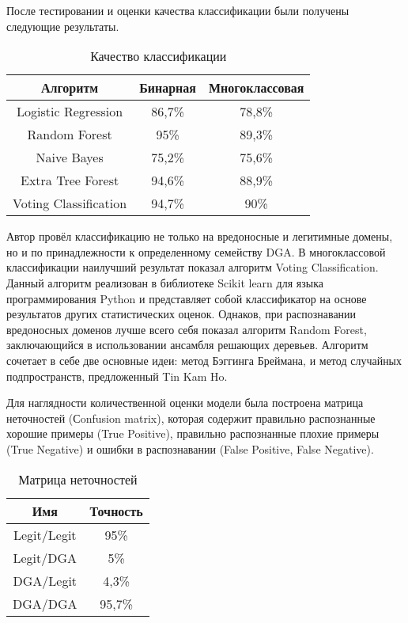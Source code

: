    После тестировании и оценки качества классификации были получены следующие результаты.
    \begin{table}[ht]
    \centering
    \caption{Качество классификации}\label{}
    \begin{tabular}{@{}ccc@{}}
    \toprule
    Алгоритм              & Бинарная & Многоклассовая \\ \midrule
    Logistic Regression   & 86,7\%   & 78,8\%         \\
    Random Forest         & 95\%     & 89,3\%         \\
    Naive Bayes           & 75,2\%   & 75,6\%         \\
    Extra Tree Forest     & 94,6\%   & 88,9\%         \\
    Voting Classification & 94,7\%   & 90\%           \\ \bottomrule
    \end{tabular}
    \end{table}

    Автор провёл классификацию не только на вредоносные и легитимные домены, но и по принадлежности к определенному семейству DGA. В многоклассовой классификации наилучший результат показал алгоритм Voting Classification. Данный алгоритм реализован в библиотеке Scikit learn для языка программирования Python и представляет собой классификатор на основе результатов других статистических оценок. Однаков, при распознавании вредоносных доменов лучше всего себя показал алгоритм Random Forest, заключающийся в использовании ансамбля решающих деревьев. Алгоритм сочетает в себе две основные идеи: метод Бэггинга Бреймана, и метод случайных подпространств, предложенный Tin Kam Ho.

    Для наглядности количественной оценки модели была построена матрица неточностей (Сonfusion matrix), которая содержит правильно распознанные хорошие примеры (True Positive), правильно распознанные плохие примеры (True Negative) и ошибки в распознавании (False Positive, False Negative).
    \begin{table}[ht]
    \centering
    \caption{Матрица неточностей}\label{}
    \begin{tabular}{@{}cc@{}}
    \toprule
    Имя         & Точность \\ \midrule
    Legit/Legit & 95\%     \\
    Legit/DGA   & 5\%      \\
    DGA/Legit   & 4,3\%    \\
    DGA/DGA     & 95,7\%   \\ \bottomrule
    \end{tabular}
    \end{table}

